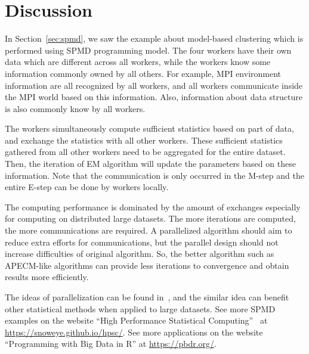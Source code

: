 \section[Discussion]{Discussion}
\label{sec:discussion}

In Section~\ref{sec:spmd}, we saw the example about model-based clustering
which is performed using SPMD programming model.
The four workers have their own data which are different across all workers,
while the workers know some information commonly owned by all others.
For example, MPI environment information are all recognized by all workers,
and all workers communicate inside the MPI world based on this information.
Also, information about data structure is also commonly know by all workers.

The workers simultaneously compute sufficient statistics based on part of data,
and exchange the statistics with all other workers.
These sufficient statistics gathered from all other workers
need to be aggregated for the entire dataset.
Then, the iteration of EM algorithm will update the parameters
based on these information.
Note that the communication is only occurred in the M-step and the
entire E-step can be done by workers locally.

The computing performance is dominated by the amount of exchanges especially
for computing on distributed large datasets.
The more iterations are computed, the more communications are required.
A parallelized algorithm should aim to reduce extra efforts for
communications, but the parallel design should not increase difficulties
of original algorithm.
So, the better algorithm such as APECM-like algorithms can provide
less iterations to convergence and obtain results more efficiently.

The ideas of parallelization can be found in~\citet{Chen2012a},
and the similar idea can benefit other statistical methods when
applied to large datasets.
See more SPMD examples on the website
``High Performance Statistical Computing''~\citep{hpsc2012} at
\url{https://snoweye.github.io/hpsc/}.
See more applications on the website
``Programming with Big Data in R'' at
\url{https://pbdr.org/}.
